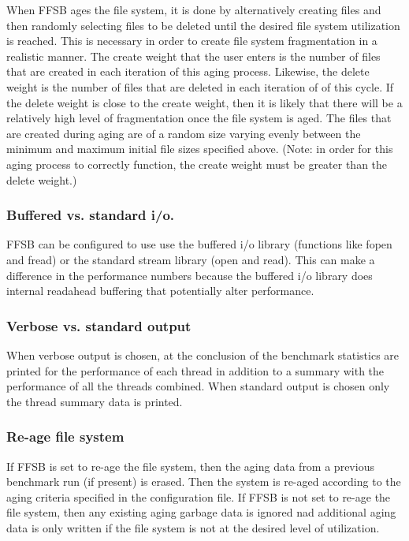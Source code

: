 \documentclass[twocolumn]{article}
\begin{document}
When FFSB ages the file system, it is done by alternatively creating
files and then randomly selecting files to be deleted until the
desired file system utilization is reached. This is necessary in order
to create file system fragmentation in a realistic manner.  The create
weight that the user enters is the number of files that are created in
each iteration of this aging process.  Likewise, the delete weight is
the number of files that are deleted in each iteration of of this
cycle.  If the delete weight is close to the create weight, then it is
likely that there will be a relatively high level of fragmentation
once the file system is aged.  The files that are created during aging
are of a random size varying evenly between the minimum and maximum
initial file sizes specified above.  (Note: in order for this aging
process to correctly function, the create weight must be greater than
the delete weight.)

\subsubsection{Buffered vs. standard i/o.}

FFSB can be configured to use use the buffered i/o library (functions
like fopen and fread) or the standard stream library (open and read).
This can make a difference in the performance numbers because the
buffered i/o library does internal readahead buffering that
potentially alter performance.

\subsubsection{Verbose vs. standard output}

When verbose output is chosen, at the conclusion of the benchmark
statistics are printed for the performance of each thread in addition
to a summary with the performance of all the threads combined.  When
standard output is chosen only the thread summary data is printed.

\subsubsection{Re-age file system}

If FFSB is set to re-age the file system, then the aging data from a
previous benchmark run (if present) is erased.  Then the system is
re-aged according to the aging criteria specified in the configuration
file.  If FFSB is not set to re-age the file system, then any existing
aging garbage data is ignored nad additional aging data is only
written if the file system is not at the desired level of utilization.
\end{document}
